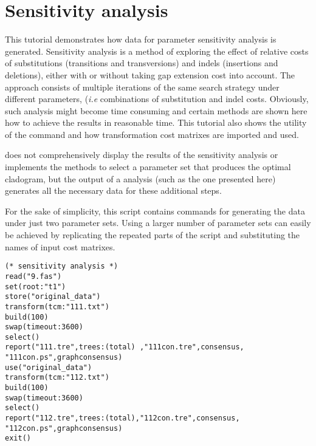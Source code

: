 \section{Sensitivity analysis}{\label{tutorial 5}}

This tutorial demonstrates how data for parameter sensitivity analysis is generated. Sensitivity analysis \cite{wheeler1995} is a method of exploring the effect of relative costs of substitutions (transitions and transversions) and indels (insertions and deletions), either with or without taking gap extension cost into account. The approach consists of multiple iterations of the same search strategy under different parameters, (\emph{i.e} combinations of substitution and indel costs. Obviously, such analysis might become time consuming and certain methods are shown here how to achieve the results in reasonable time. This tutorial also shows the utility of the command  and how transformation cost matrixes are imported and used.

\poy does not comprehensively display the results of the sensitivity analysis or implements the methods to select a parameter set that produces the optimal cladogram, but the output of a \poy analysis (such as the one presented here) generates all the necessary data for these additional steps.

For the sake of simplicity, this script contains commands for generating the data under just two parameter  sets. Using a larger number of parameter sets can easily be achieved by replicating the repeated parts of the script and substituting the names of input cost matrixes.

\begin{verbatim}
(* sensitivity analysis *)
read("9.fas")
set(root:"t1")
store("original_data")
transform(tcm:"111.txt")
build(100)
swap(timeout:3600)
select()
report("111.tre",trees:(total) ,"111con.tre",consensus,
"111con.ps",graphconsensus)
use("original_data")
transform(tcm:"112.txt")
build(100)
swap(timeout:3600)
select()
report("112.tre",trees:(total),"112con.tre",consensus,
"112con.ps",graphconsensus)
exit()
\end{verbatim}


